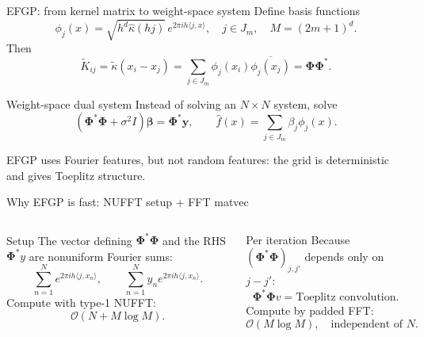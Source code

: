 \documentclass[aspectratio=169,11pt]{ctexbeamer}
\newcommand{\y}{\mathbf{y}}
\newcommand{\betaVec}{\bm{\beta}}
\newcommand{\PhiMat}{\bm{\Phi}}
\newcommand{\OO}{\mathcal{O}}
\begin{document}
\begin{frame}{EFGP: from kernel matrix to weight-space system}
Define basis functions
\[
\phi_j(x)=\sqrt{h^d\widehat\kappa(hj)}\, e^{2\pi i h\langle j,x\rangle},
\quad j\in J_m,
\quad M=(2m+1)^d.
\]
Then
\[
\widetilde K_{ij}=\widetilde\kappa(x_i-x_j)=\sum_{j\in J_m}\phi_j(x_i)\overline{\phi_j(x_j)}
=\PhiMat\PhiMat^*.
\]
\begin{block}{Weight-space dual system}
Instead of solving an $N\times N$ system, solve
\[
(\PhiMat^*\PhiMat+\sigma^2 I)\betaVec=\PhiMat^*\y,
\qquad \widehat f(x)=\sum_{j\in J_m}\beta_j\phi_j(x).
\]
\end{block}
\vspace{-0.1cm}
\small EFGP uses Fourier features, but not random features: the grid is deterministic and gives Toeplitz structure.
\end{frame}

\begin{frame}{Why EFGP is fast: NUFFT setup + FFT matvec}
\begin{columns}[T,onlytextwidth]
\begin{block}{Setup}
The vector defining $\PhiMat^*\PhiMat$ and the RHS $\PhiMat^*y$ are nonuniform Fourier sums:
\[
\sum_{n=1}^{N}e^{2\pi ih\langle j,x_n\rangle},\qquad
\sum_{n=1}^{N}y_ne^{2\pi ih\langle j,x_n\rangle}.
\]
Compute with type-1 NUFFT:
\[
\OO(N+M\log M).
\]
\end{block}
\begin{block}{Per iteration}
Because $(\PhiMat^*\PhiMat)_{j,j'}$ depends only on $j-j'$:
\[
\PhiMat^*\PhiMat v = \text{Toeplitz convolution}.
\]
Compute by padded FFT:
\[
\OO(M\log M),\quad \text{independent of } N.
\]
\end{block}
\end{columns}
\vspace{0.25cm}
\begin{center}
\end{center}
\end{frame}
\end{document}
